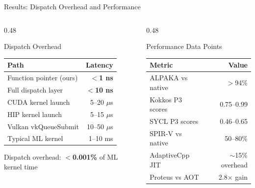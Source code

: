 \documentclass[aspectratio=169,10pt]{beamer}
\begin{document}
\begin{frame}{Results: Dispatch Overhead and Performance}
  \begin{columns}[T]
    \begin{column}{0.48\textwidth}
      \begin{block}{Dispatch Overhead}
        \begin{center}
        \begin{tabular}{@{}l r@{}}
          \toprule
          \textbf{Path} & \textbf{Latency} \\
          \midrule
          Function pointer (ours) & \textbf{$<$1 ns} \\
          Full dispatch layer     & \textbf{$<$10 ns} \\
          \midrule
          CUDA kernel launch      & 5--20 $\mu$s \\
          HIP kernel launch       & 5--15 $\mu$s \\
          Vulkan vkQueueSubmit    & 10--50 $\mu$s \\
          \midrule
          Typical ML kernel       & 1--10 ms \\
          \bottomrule
        \end{tabular}
        \end{center}
        \vspace{0.3em}
        {\small Dispatch overhead: \textbf{$<$0.001\%} of ML kernel time}
      \end{block}
    \end{column}
    \begin{column}{0.48\textwidth}
      \begin{block}{Performance Data Points}
        \begin{center}
        \begin{tabular}{@{}l r@{}}
          \toprule
          \textbf{Metric} & \textbf{Value} \\
          \midrule
          ALPAKA vs native  & $>$94\% \\
          Kokkos P3 scores  & 0.75--0.99 \\
          SYCL P3 scores    & 0.46--0.65 \\
          SPIR-V vs native  & 50--80\% \\
          AdaptiveCpp JIT   & $\sim$15\% overhead \\
          Proteus vs AOT    & 2.8$\times$ gain \\

\end{tabular}
\end{center}
\end{block}
\end{column}
\end{columns}
\end{frame}
\end{document}
